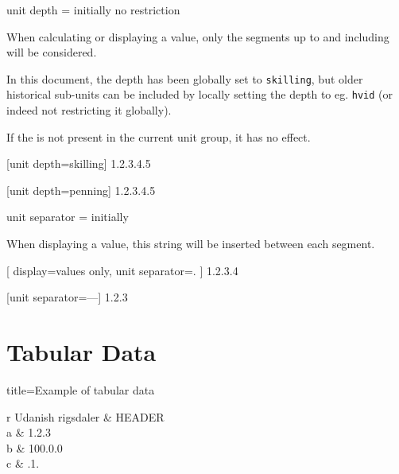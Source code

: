 \documentclass[
	a4paper,
	margin=4cm
]{article}
\begin{document}
\begin{docKey}
	{unit depth}
	{=}
	{initially no restriction}
	
	When calculating or displaying a value, only the segments up to and including  will be considered.
	
	In this document, the depth has been globally set to \texttt{skilling}, but older historical sub-units can be included by locally setting the depth to eg. \texttt{hvid} (or indeed not restricting it globally).
	
	If the  is not present in the current unit group, it has no effect.
	
\begin{dispExample}
	[unit depth=skilling]
	{1.2.3.4.5}

	[unit depth=penning]
	{1.2.3.4.5}
\end{dispExample}
\end{docKey}

\begin{docKey}
	{unit separator}
	{=}
	{initially }
	
	When displaying a value, this string will be inserted between each segment.

\begin{dispExample}
[
		display=values only,
		unit separator=.
	]
	{1.2.3.4}

	[unit separator={---}]
	{1.2.3}
\end{dispExample}

\end{docKey}


\clearpage
\section{Tabular Data} %

\begin{dispExample*}{
	title=Example of tabular data
}
\begingroup
{}
\begin{tblr}{r U{danish rigsdaler}}
	\toprule
	& HEADER \\
	\midrule
	a & 1.2.3 \\
	b & 100.0.0 \\
	c & .1. \\
	\bottomrule
\end{tblr}
\endgroup
\end{dispExample*}
\end{document}
